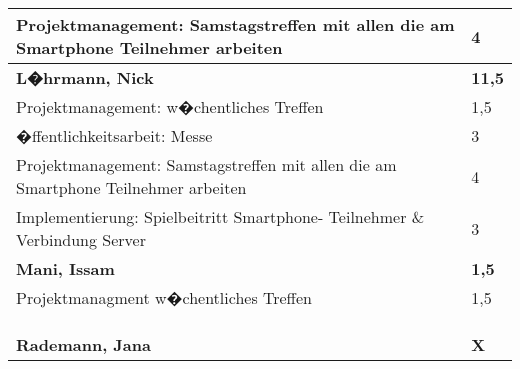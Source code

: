 \documentclass[a4paper,11pt]{scrartcl}
\begin{document}
\begin{longtable}{| p{13.8cm} | C{2.4cm} |}
  Projektmanagement: Samstagstreffen mit allen die am Smartphone Teilnehmer arbeiten
	&
  4
	\\
	\hline
	\hline


	\textbf{L�hrmann, Nick} & \textbf{11,5}\\ %
	\hline

	Projektmanagement: w�chentliches Treffen
	&
	1,5
	\\
	\hline

	�ffentlichkeitsarbeit: Messe
	&
  3
	\\
	\hline

  Projektmanagement: Samstagstreffen mit allen die am Smartphone Teilnehmer arbeiten
	&
  4
	\\
	\hline

  Implementierung: Spielbeitritt Smartphone- Teilnehmer \& Verbindung Server
	&
  3
	\\
	\hline
	\hline


	\textbf{Mani, Issam} & \textbf{1,5}\\ %
	\hline

  Projektmanagment w�chentliches Treffen
	&
  1,5
	\\
	\hline


	&

	\\
	\hline


	&

	\\
	\hline


	&

	\\
	\hline
	\hline


	\textbf{Rademann, Jana} & \textbf{X}\\ %
	\hline



\end{longtable}
\end{document}
